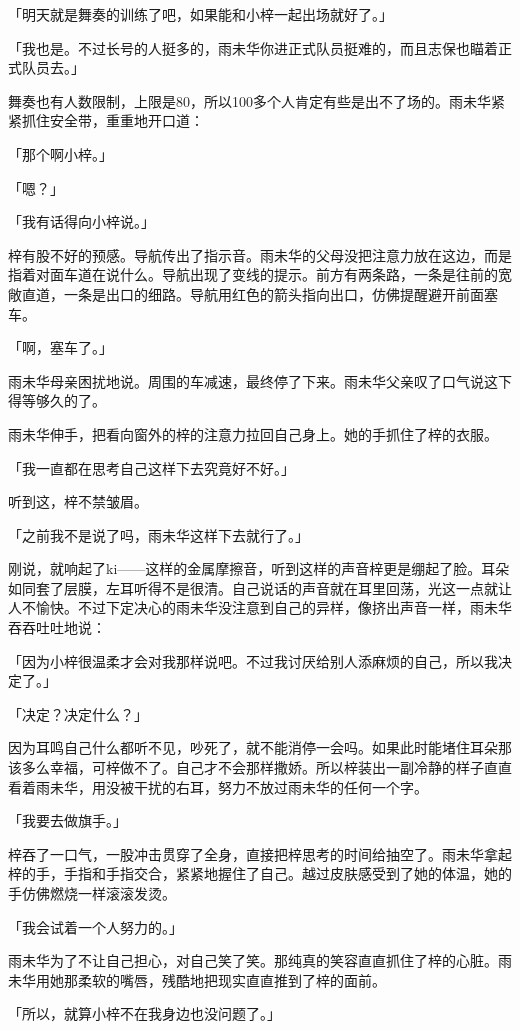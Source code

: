 \documentclass[UTF8]{ctexart}
\begin{document}
    「明天就是舞奏的训练了吧，如果能和小梓一起出场就好了。」

    「我也是。不过长号的人挺多的，雨未华你进正式队员挺难的，而且志保也瞄着正式队员去。」

    舞奏也有人数限制，上限是80，所以100多个人肯定有些是出不了场的。雨未华紧紧抓住安全带，重重地开口道：

    「那个啊小梓。」

    「嗯？」

    「我有话得向小梓说。」

    梓有股不好的预感。导航传出了指示音。雨未华的父母没把注意力放在这边，而是指着对面车道在说什么。导航出现了变线的提示。前方有两条路，一条是往前的宽敞直道，一条是出口的细路。导航用红色的箭头指向出口，仿佛提醒避开前面塞车。

    「啊，塞车了。」

    雨未华母亲困扰地说。周围的车减速，最终停了下来。雨未华父亲叹了口气说这下得等够久的了。

    雨未华伸手，把看向窗外的梓的注意力拉回自己身上。她的手抓住了梓的衣服。

    「我一直都在思考自己这样下去究竟好不好。」

    听到这，梓不禁皱眉。

    「之前我不是说了吗，雨未华这样下去就行了。」

    刚说，就响起了ki——这样的金属摩擦音，听到这样的声音梓更是绷起了脸。耳朵如同套了层膜，左耳听得不是很清。自己说话的声音就在耳里回荡，光这一点就让人不愉快。不过下定决心的雨未华没注意到自己的异样，像挤出声音一样，雨未华吞吞吐吐地说：

    「因为小梓很温柔才会对我那样说吧。不过我讨厌给别人添麻烦的自己，所以我决定了。」

    「决定？决定什么？」

    因为耳鸣自己什么都听不见，吵死了，就不能消停一会吗。如果此时能堵住耳朵那该多么幸福，可梓做不了。自己才不会那样撒娇。所以梓装出一副冷静的样子直直看着雨未华，用没被干扰的右耳，努力不放过雨未华的任何一个字。

    「我要去做旗手。」

    梓吞了一口气，一股冲击贯穿了全身，直接把梓思考的时间给抽空了。雨未华拿起梓的手，手指和手指交合，紧紧地握住了自己。越过皮肤感受到了她的体温，她的手仿佛燃烧一样滚滚发烫。

    「我会试着一个人努力的。」

    雨未华为了不让自己担心，对自己笑了笑。那纯真的笑容直直抓住了梓的心脏。雨未华用她那柔软的嘴唇，残酷地把现实直直推到了梓的面前。

    「所以，就算小梓不在我身边也没问题了。」
\end{document}
